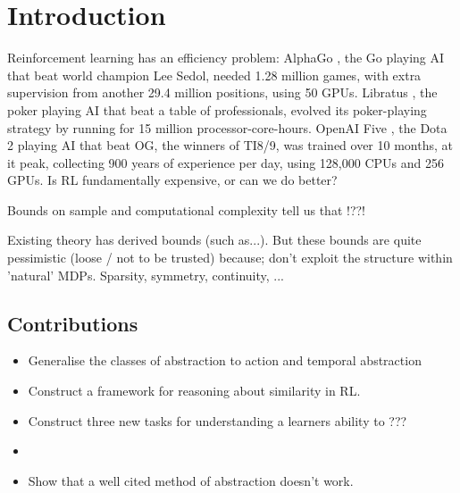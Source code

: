 \chapter{Introduction}\label{C:intro}

Reinforcement learning has an efficiency problem: AlphaGo \cite{Silver2016a}, the Go
playing AI that beat world champion Lee Sedol, needed 1.28 million games, with
extra supervision from another 29.4 million positions, using 50 GPUs.
Libratus \cite{Brown2018b}, the poker playing AI that beat a table of professionals,
evolved its poker-playing strategy by running for 15 million processor-core-hours.
OpenAI Five \cite{OpenAI2018}, the Dota 2 playing AI that beat OG, the winners of TI8/9, was
trained over 10 months, at it peak, collecting 900 years of experience per day, using
128,000 CPUs and 256 GPUs. Is RL fundamentally expensive, or can we do better?

Bounds on sample and computational complexity tell us that !??!



Existing theory has derived bounds (such as...). But these bounds are quite pessimistic (loose / not to be trusted) because;
don't exploit the structure within 'natural' MDPs. Sparsity, symmetry, continuity, ...


\section{Contributions}

\begin{itemize}
  \item Generalise the classes of abstraction to action and temporal abstraction
  \item Construct a framework for reasoning about similarity in RL.
  \item Construct three new tasks for understanding a learners ability to ???
  \item 
  \item Show that a well cited method of abstraction doesn't work.
\end{itemize}
